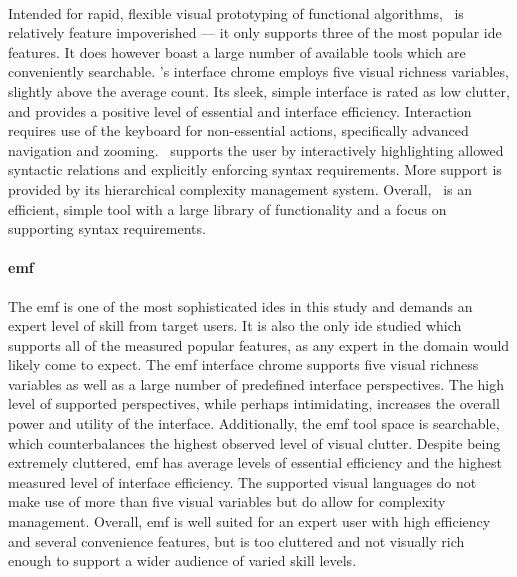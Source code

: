 \paragraph{\cameleon} Intended for rapid, flexible visual prototyping of
functional algorithms, \cameleon~is relatively feature impoverished --- it
only supports three of the most popular \ac{ide} features. It does however
boast a large number of available tools which are conveniently searchable.
\cameleon's interface chrome employs five visual richness variables,
slightly above the average count. Its sleek, simple interface is rated as
low clutter, and provides a positive level of essential and interface
efficiency. Interaction requires use of the keyboard for non-essential
actions, specifically advanced navigation and zooming. \cameleon~supports
the user by interactively highlighting allowed syntactic relations and
explicitly enforcing syntax requirements. More support is provided by its
hierarchical complexity management system. Overall, \cameleon~is an
efficient, simple tool with a large library of functionality and a focus on
supporting syntax requirements.

\paragraph{\acl{emf}} The \ac{emf} is one of the most sophisticated
\acp{ide} in this study and demands an expert level of skill from target
users. It is also the only \ac{ide} studied which supports all of the
measured popular features, as any expert in the domain would likely come to
expect. The \ac{emf} interface chrome supports five visual richness
variables as well as a large number of predefined interface perspectives.
The high level of supported perspectives, while perhaps intimidating,
increases the overall power and utility of the interface. Additionally, the
\ac{emf} tool space is searchable, which counterbalances the highest
observed level of visual clutter. Despite being extremely cluttered,
\ac{emf} has average levels of essential efficiency and the highest
measured level of interface efficiency. The supported visual languages do
not make use of more than five visual variables but do allow for complexity
management. Overall, \ac{emf} is well suited for an expert user with high
efficiency and several convenience features, but is too cluttered and not
visually rich enough to support a wider audience of varied skill levels.

